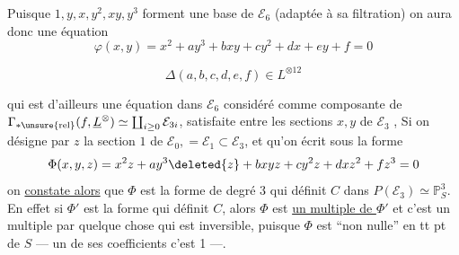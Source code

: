  Puisque $1,y,x,y^2,xy,y^3$ forment une base de $\mathcal E_6$ (adaptée à sa filtration) on aura donc une équation
\[
\varphi(x,y)=\boxed{x^2+ay^3+bxy+cy^2+dx+ey+f=0}
\]

\[
\Delta(a,b,c,d,e,f)\in L^{\otimes12}
\]

qui est d'ailleurs une équation  dans $\mathcal E_6$ considéré comme composante de $\Gamma_{*\mathrm{\unsure{rel}}}(f,\underline L^{\otimes})\simeq\coprod_{i\geq0}\mathcal E_{3i}$, satisfaite entre les sections $x,y$ de $\mathcal E_3$ ,   Si on désigne par $z$ la section $1$ de $\mathcal E_0,=\mathcal E_1\subset\mathcal E_3$, et qu'on  écrit  sous la forme
\[
\Phi(x,y,z)=x^2z+ay^3\deleted{z}+bxyz+cy^2z+dxz^2+fz^3=0
\]
on \uline{constate alors} que $\Phi$ est la forme de degré 3 qui définit  $C$ dans $P(\mathcal E_3)\simeq\mathbb P^3_S$. En effet si $\Phi'$ est la forme qui définit $C$, alors $\Phi$ est \uline{un multiple de $\Phi'$} et  c'est un multiple par quelque chose qui est inversible, puisque $\Phi$ est ``non nulle'' en tt pt de $S$ --- un de ses coefficients c'est 1 ---.

